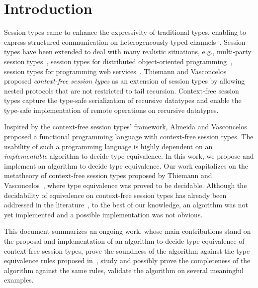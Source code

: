 
\section{Introduction}
\label{sec:introduction}

Session types came to enhance the expressivity of traditional types, enabling to express structured communication on heterogeneously typed channels~\cite{DBLP:conf/concur/Honda93,DBLP:conf/parle/TakeuchiHK94}. Session types have been extended to deal with many realistic situations, e.g., multi-party session types~\cite{DBLP:conf/popl/HondaYC08}, session types for distributed object-oriented programming~\cite{DBLP:conf/popl/GayVRGC10}, session types for programming web services~\cite{DBLP:journals/toplas/CarboneHY12}. Thiemann and Vasconcelos~\cite{thiemann2016context} proposed {\it context-free session types} as an extension of session types by allowing nested protocols that are not restricted to tail recursion. Context-free session types capture the type-safe serialization of recursive datatypes and enable the type-safe implementation of remote operations on recursive datatypes. 

Inspired by the context-free session types' framework, Almeida and Vasconcelos~\cite{bernardo} proposed a functional programming language with context-free session types. The usability of such a programming language is highly dependent on an {\it implementable} algorithm to decide type equivalence. In this work, we propose and implement an algorithm to decide type equivalence. Our work capitalizes on the metatheory of context-free session types proposed by Thiemann and Vasconcelos~\cite{thiemann2016context}, where type equivalence was proved to be decidable. Although the decidability of equivalence on context-free session types has already been addressed in the literature~\cite{thiemann2016context,janvcar1999techniques,DBLP:journals/iandc/ChristensenHS95}, to the best of our knowledge, an algorithm was not yet implemented and a possible implementation was not obvious.

This document summarizes an ongoing work, whose main contributions stand on the proposal and implementation of an algorithm to decide type equivalence of context-free session types, prove the soundness of the algorithm against the type equivalence rules proposed in~\cite{thiemann2016context}, study and possibly prove the completeness of the algorithm against the same rules, validate the algorithm on several meaningful examples.

